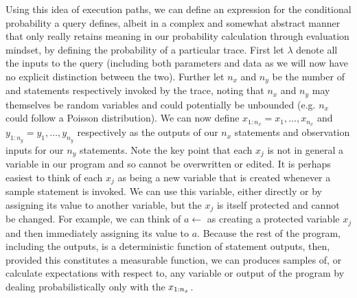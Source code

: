 Using this idea of execution paths, we can define an expression for the conditional probability a query defines,
albeit in a complex and somewhat abstract manner that only really retains meaning in our probability calculation through
evaluation mindset, by defining the probability of a particular trace.  First let $\lambda$ denote all the 
inputs to the query (including both parameters and
data as we will now have no explicit distinction between the two).  Further let
$n_x$ and $n_y$ be the number of \sample and \observe statements
respectively invoked by the trace, noting that $n_x$ and $n_y$ may themselves be random variables and could
potentially be unbounded (e.g. $n_x$ could follow a Poisson distribution).
We can now define $x_{1:n_x} = x_1,\dots,x_{n_x}$ and $y_{1:n_y} = y_1,\dots,y_{n_y}$ respectively as the
outputs of our $n_x$ \sample statements and observation inputs for our $n_y$ \observe statements.
Note the key point that each $x_j$ is not in general a variable in our program and so cannot be overwritten
or edited.  It is perhaps easiest to think of each $x_j$ as being a new variable that is created whenever a sample
statement is invoked.  We can use this variable, either directly or by assigning its value to another variable,
but the $x_j$ is itself protected and cannot be changed.  For example, we can think of
$a \leftarrow$ as creating a protected variable $x_j$ and then immediately assigning its
value to $a$.  Because the rest of the program, including the outputs, is a deterministic function of \sample
statement outputs, then, provided this constitutes a measurable function, we
can produces samples of, or calculate expectations with respect to, any variable or output of the program
by dealing probabilistically only with the $x_{1:n_x}$.

